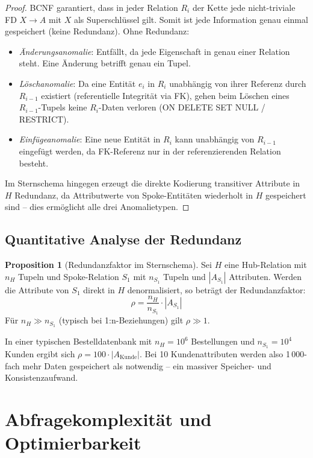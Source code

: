 ﻿\documentclass[a4paper,12pt]{report}
\theoremstyle{definition}
\newtheorem{proposition}[theorem]{Proposition}
\theoremstyle{remark}
\begin{document}
\begin{proof}
BCNF garantiert, dass in jeder Relation $R_i$ der Kette jede nicht-triviale
FD $X \to A$ mit $X$ als Superschlüssel gilt. Somit ist jede Information
genau einmal gespeichert (keine Redundanz). Ohne Redundanz:
\begin{itemize}
  \item \emph{Änderungsanomalie}: Entfällt, da jede Eigenschaft in genau einer
        Relation steht. Eine Änderung betrifft genau ein Tupel.
  \item \emph{Löschanomalie}: Da eine Entität $e_i$ in $R_i$ unabhängig von
        ihrer Referenz durch $R_{i-1}$ existiert (referentielle Integrität
        via FK), gehen beim Löschen eines $R_{i-1}$-Tupels keine $R_i$-Daten
        verloren (ON DELETE SET NULL / RESTRICT).
  \item \emph{Einfügeanomalie}: Eine neue Entität in $R_i$ kann unabhängig
        von $R_{i-1}$ eingefügt werden, da FK-Referenz nur in der
        referenzierenden Relation besteht.
\end{itemize}
Im Sternschema hingegen erzeugt die direkte Kodierung transitiver Attribute
in $H$ Redundanz, da Attributwerte von Spoke-Entitäten wiederholt in $H$
gespeichert sind -- dies ermöglicht alle drei Anomalietypen.
\end{proof}

\subsection{Quantitative Analyse der Redundanz}

\begin{proposition}[Redundanzfaktor im Sternschema]
\label{prop:redundanz}
Sei $H$ eine Hub-Relation mit $n_H$ Tupeln und Spoke-Relation $S_1$ mit
$n_{S_1}$ Tupeln und $|A_{S_1}|$ Attributen. Werden die Attribute von $S_1$
direkt in $H$ denormalisiert, so beträgt der Redundanzfaktor:
\[
  \rho = \frac{n_H}{n_{S_1}} \cdot |A_{S_1}|
\]
Für $n_H \gg n_{S_1}$ (typisch bei 1:n-Beziehungen) gilt $\rho \gg 1$.
\end{proposition}

In einer typischen Bestelldatenbank mit $n_H = 10^6$ Bestellungen und
$n_{S_1} = 10^4$ Kunden ergibt sich $\rho = 100 \cdot |A_{\text{Kunde}}|$.
Bei 10 Kundenattributen werden also 1\,000-fach mehr Daten gespeichert
als notwendig -- ein massiver Speicher- und Konsistenzaufwand.

\section{Abfragekomplexität und Optimierbarkeit}
\label{sec:abfragen}
\end{document}
